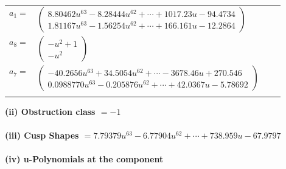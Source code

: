 \documentclass[1p]{elsarticle_modified}
\theoremstyle{definition}
\begin{document}
\begin{tabular}{m{7pt} m{180pt} m{7pt} m{180pt} }
\flushright $a_{1}=$&$\begin{pmatrix}8.80462 u^{63}-8.28444 u^{62}+\cdots+1017.23 u-94.4734\\1.81167 u^{63}-1.56254 u^{62}+\cdots+166.161 u-12.2864\end{pmatrix}$ \\
\flushright $a_{8}=$&$\begin{pmatrix}- u^2+1\\- u^2\end{pmatrix}$ \\
\flushright $a_{7}=$&$\begin{pmatrix}-40.2656 u^{63}+34.5054 u^{62}+\cdots-3678.46 u+270.546\\0.0988770 u^{63}-0.205876 u^{62}+\cdots+42.0367 u-5.78692\end{pmatrix}$\\&\end{tabular}
\flushleft \textbf{(ii) Obstruction class $= -1$}\\~\\
\flushleft \textbf{(iii) Cusp Shapes $= 7.79379 u^{63}-6.77904 u^{62}+\cdots+738.959 u-67.9797$}\\~\\
\newpage\renewcommand{\arraystretch}{1}
\flushleft \textbf{(iv) u-Polynomials at the component}\newline \\
\end{document}

